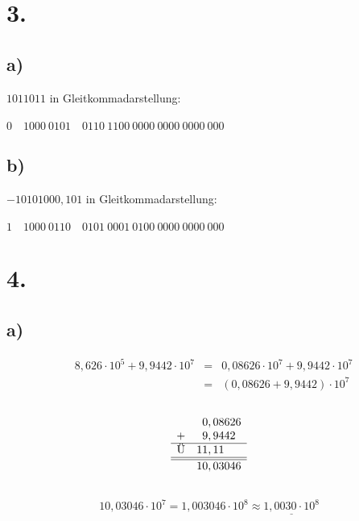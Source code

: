 \documentclass[a4paper]{scrartcl}
\begin{document}
\section{3.}	
	\subsection{a)}
		\(1011011\) in Gleitkommadarstellung: \\ \\
		\(0\quad 1000\ 0101\quad 0110\ 1100\ 0000\ 0000\ 0000\ 000\)		
		
	\subsection{b)}
		\(-1010 1000, 101\) in Gleitkommadarstellung: \\ \\
		\(1\quad 1000\ 0110\quad 0101\ 0001\ 0100\ 0000\ 0000\ 000\)
\newpage
\section{4.}
	\subsection{a)}
		\[
		\begin{array}{rrcl}
			&8,626 \cdot 10^5  + 9,9442 \cdot 10^7 &=& 0,08626 \cdot 10^7 + 9,9442 \cdot 10^7 \\
			&&=&(0,08626 + 9,9442) \cdot 10^7
		\end{array}
		\] \\	
		\[
		\begin{array}{cl}
				 	 &\ \, 0,08626  \\
					+&\ \, 9,9442   \\ \hline
			\text{Ü} & 1 1,1 1\ \ \\ \hline\hline
			&10,03046
		\end{array}
		\] \\
		\[
		\begin{array}{rcl}
			10,03046\cdot 10^7 = 1,003046 \cdot 10^8 \approx \underline{1,0030\cdot 10^8}
		\end{array}
		\]
		
\end{document}
